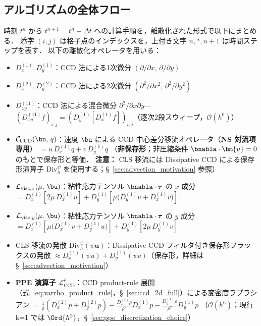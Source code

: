 \subsection{アルゴリズムの全体フロー}
\label{sec:algo_flow}

時刻 $t^n$ から $t^{n+1} = t^n + \Delta t$ への計算手順を，離散化された形式で以下にまとめる．
添字 $(i,j)$ は格子点のインデックスを，上付き文字 $n, *, n+1$ は時間ステップを表す．
以下の離散化オペレータを用いる：
\begin{itemize}
  \item $D_x^{(1)}, D_y^{(1)}$：CCD 法による1次微分 $(\partial/\partial x,\, \partial/\partial y)$
  \item $D_x^{(2)}, D_y^{(2)}$：CCD 法による2次微分 $(\partial^2/\partial x^2,\, \partial^2/\partial y^2)$
  \item $D_{xy}^{(11)}$：CCD 法による混合微分 $\partial^2/\partial x\partial y$—
        $(D_{xy}^{(11)} f)_{i,j} = (D_y^{(1)}[D_x^{(1)} f])_{i,j}$（逐次2段スウィープ，$\mathcal{O}(h^6)$）
  \item $\mathcal{C}_{\text{CCD}}(\bu,\, q)$：速度 $\bu$ による CCD 中心差分移流オペレータ（\textbf{NS 対流項専用}）
          $\displaystyle= u\,D_x^{(1)} q + v\,D_y^{(1)} q$
          （\textbf{非保存形}；非圧縮条件 $\bnabla\cdot\bm{u}=0$ のもとで保存形と等価．
          \textbf{注意：} CLS 移流には Dissipative CCD による保存形演算子 $\mathrm{Div}_h^{\psi}$ を使用する；§~\ref{sec:advection_motivation} 参照）
  \item $\mathcal{L}_{\text{visc},x}(\mu,\, \bu)$：粘性応力テンソル $\bnabla\cdot\boldsymbol{\tau}$ の $x$ 成分\newline
          $\displaystyle= D_x^{(1)}\!\left[2\mu\,D_x^{(1)} u\right] + D_y^{(1)}\!\left[\mu\bigl(D_y^{(1)} u + D_x^{(1)} v\bigr)\right]$
  \item $\mathcal{L}_{\text{visc},y}(\mu,\, \bu)$：粘性応力テンソル $\bnabla\cdot\boldsymbol{\tau}$ の $y$ 成分\newline
          $\displaystyle= D_x^{(1)}\!\left[\mu\bigl(D_x^{(1)} v + D_y^{(1)} u\bigr)\right] + D_y^{(1)}\!\left[2\mu\,D_y^{(1)} v\right]$
  \item CLS 移流の発散 $\text{Div}_h^{\psi}(\psi\bm{u})$：Dissipative CCD フィルタ付き保存形フラックスの発散
          $\approx D_x^{(1)}(\psi u) + D_y^{(1)}(\psi v)$（保存形，詳細は§~\ref{sec:advection_motivation}）
  \item \textbf{PPE 演算子} $\mathcal{L}_{\mathrm{CCD}}^{\rho}$：CCD product-rule 展開（式~\eqref{eq:varrho_product_rule}，§~\ref{sec:ccd_2d_full}）による変密度ラプラシアン
          $\displaystyle= \frac{1}{\rho}(D_x^{(2)}p + D_y^{(2)}p)
            - \frac{D_x^{(1)}\rho}{\rho^2}D_x^{(1)}p
            - \frac{D_y^{(1)}\rho}{\rho^2}D_y^{(1)}p$
          （$\mathcal{O}(h^6)$；現行 k=1 では $\Ord{h^2}$，§~\ref{sec:ppe_discretization_choice}）
\end{itemize}

